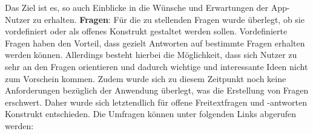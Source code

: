 	Das Ziel ist es, so auch Einblicke in die Wünsche und Erwartungen der App-Nutzer zu erhalten.%
%
\newline
\myNewSection
\textbf{Fragen}: %
Für die zu stellenden Fragen wurde überlegt, ob sie vordefiniert oder als offenes Konstrukt gestaltet werden sollen. %
	Vordefinierte Fragen haben den Vorteil, dass gezielt Antworten auf bestimmte Fragen erhalten werden können. %
	Allerdings besteht hierbei die Möglichkeit, dass sich Nutzer zu sehr an den Fragen orientieren und dadurch wichtige und interessante Ideen nicht zum Vorschein kommen. %
	Zudem wurde sich zu diesem Zeitpunkt noch keine Anforderungen bezüglich der Anwendung überlegt, was die Erstellung von Fragen erschwert. %
Daher wurde sich letztendlich für offene Freitextfragen und -antworten Konstrukt entschieden.%
%
\myNewSection
Die Umfragen können unter folgenden Links abgerufen werden: \myTodo%